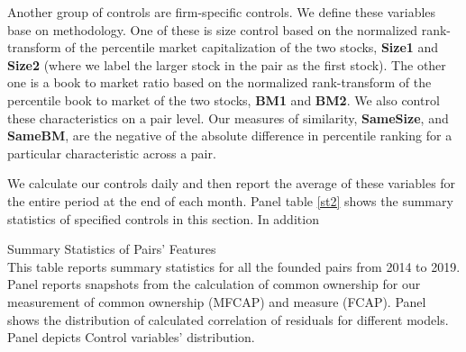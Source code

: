 %				


Another group of controls are firm-specific controls.  We define these variables base on  \cite{AntonPolk} methodology. One of these is size control based on the normalized rank-transform of the percentile market capitalization of the two stocks, \textbf{Size1} and \textbf{Size2} (where we label the
larger stock in the pair as the first stock). The other one is a book to market ratio based on the normalized rank-transform of the percentile book to market of the two stocks, \textbf{BM1} and \textbf{BM2}.
We also control these characteristics on a pair level. Our measures of similarity, \textbf{SameSize}, and \textbf{SameBM}, are the negative of the absolute difference in percentile ranking for a particular characteristic across a pair.


We calculate our controls daily and then report the average of these variables for the entire period at the end of each month. Panel  table \ref{st2} shows the summary statistics of specified controls in this section. In addition


	\captionsetup[subtable]{labelformat=parens}
			\begin{table}[htbp]
			\caption{Summary Statistics of Pairs' Features\\ \small
			This table reports summary statistics for all the founded pairs from 2014 to 2019. Panel  reports snapshots from the calculation of common ownership for our measurement of common ownership (MFCAP) and \cite{AntonPolk} measure (FCAP). Panel  shows the distribution of calculated correlation of residuals for different models. Panel  depicts Control variables' distribution.
			}
			\label{st2}
				\label{measureResults}
				\resizebox{1\textwidth}{!}
				{
						{}
				}
				\bigskip
		\centering
		\label{tCorr}
		{
			
		}
		
						\bigskip
					
 \label{ControlsSummary}
               \centering 
                 {
    
                 }
             \end{table}


